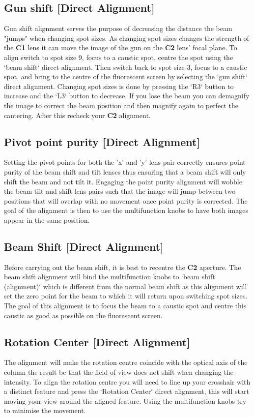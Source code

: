 \documentclass[a4paper]{scrartcl}
\begin{document}
\subsection*{Gun shift [Direct Alignment]}
Gun shift alignment serves the purpose of decreasing the distance the beam "jumps" when changing spot sizes. As changing spot sizes changes the strength of the \textbf{C1} lens it can move the image of the gun on the \textbf{C2} lens' focal plane. To align switch to spot size 9, focus to a caustic spot, centre the spot using the `beam shift` direct alignment. Then switch back to spot size 3, focus to a caustic spot, and bring to the centre of the fluorescent screen by selecting the `gun shift` direct alignment. Changing spot sizes is done by pressing the `R3` button to increase and the `L3` button to decrease. If you lose the beam you can demagnify the image to correct the beam position and then magnify again to perfect the cantering. After this recheck your \textbf{C2} alignment.

\subsection*{Pivot point purity [Direct Alignment]}
Setting the pivot points for both the 'x' and 'y' lens pair correctly ensures point purity of the beam shift and tilt lenses thus ensuring that a beam shift will only shift the beam and not tilt it. Engaging the point purity alignment will wobble the beam tilt and shift lens pairs such that the image will jump between two positions that will overlap with no movement once point purity is corrected. The goal of the alignment is then to use the multifunction knobs to have both images appear in the same position.

\subsection*{Beam Shift [Direct Alignment]}
Before carrying out the beam shift, it is best to recentre the \textbf{C2} aperture. The beam shift alignment will bind the multifunction knobs to `beam shift (alignment)` which is different from the normal beam shift as this alignment will set the zero point for the beam to which it will return upon switching spot sizes. The goal of this alignment is to focus the beam to a caustic spot and centre this caustic as good as possible on the fluorescent screen.

\subsection*{Rotation Center [Direct Alignment]}
The alignment will make the rotation centre coincide with the optical axis of the column the result be that the field-of-view does not shift when changing the intensity. To align the rotation centre you will need to line up your crosshair with a distinct feature and press the `Rotation Center` direct alignment, this will start moving your view around the aligned feature. Using the multifunction knobs try to minimise the movement.
\end{document}
